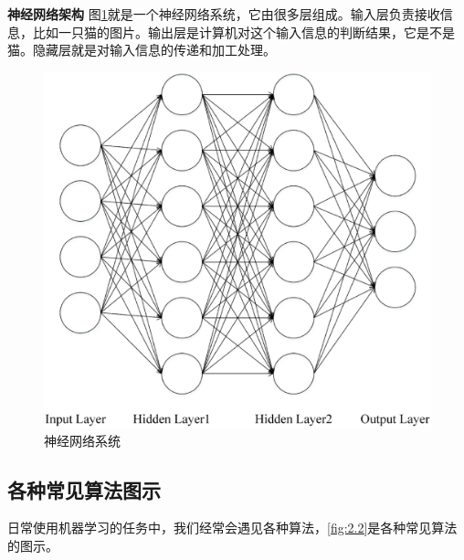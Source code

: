 {\bf 神经网络架构} 图\ref{fig:2.1}就是一个神经网络系统，它由很多层组成。输入层负责接收信息，比如一只猫的图片。输出层是计算机对这个输入信息的判断结果，它是不是猫。隐藏层就是对输入信息的传递和加工处理。

 \begin{figure}[h]
   \centering
   \includegraphics[width=.7\textwidth]{eps/2.1.eps}
   \caption{神经网络系统}
   \label{fig:2.1}
 \end{figure}

\subsection{各种常见算法图示}

日常使用机器学习的任务中，我们经常会遇见各种算法，\ref{fig:2.2}是各种常见算法的图示。

